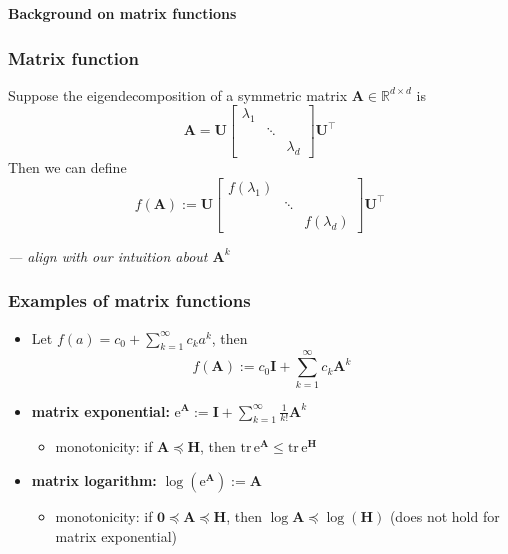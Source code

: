 \documentclass[compress,
mathserif,wide,%
]{beamer}
\begin{document}
\begin{frame}[plain]

\vfill
\begin{center}
  {\Large\bf Background on matrix functions}
\end{center}

\vfill

\end{frame}




\begin{frame}
\frametitle{Matrix function}  

Suppose the eigendecomposition of a symmetric matrix $\bm{A}\in \mathbb{R}^{d\times d}$ is 
%
{\small
\[
\bm{A}=\bm{U}\left[\begin{array}{ccc}
\lambda_{1}\\
 & \ddots\\
 &  & \lambda_{d}
\end{array}\right]\bm{U}^{\top}
\]
}
%
Then we can define 
%
{\small
\[
f(\bm{A}) := \bm{U}\left[\begin{array}{ccc}
f(\lambda_{1})\\
 & \ddots\\
 &  & f(\lambda_{d})
\end{array}\right]\bm{U}^{\top}
\]
}


{\hfill \em --- align with our intuition about $\bm{A}^{k}$}
\end{frame}


\begin{frame}
\frametitle{Examples of matrix functions}  

\begin{itemize}
	\itemsep1em
	\item Let $f(a)=c_0 + \sum_{k=1}^{\infty} c_k a^k$, then
	\[
		f(\bm{A}) := c_0 \bm{I} + \sum_{k=1}^{\infty} c_k {\bm A}^k
	\]
	\item {\bf matrix exponential:} $\mathrm{e}^{\bm{A}} := \bm{I} + \sum_{k=1}^{\infty} \frac{1}{k!} \bm{A}^k$

	\begin{itemize}
		\item monotonicity: if $\bm{A}\preceq \bm{H}$, then $\mathrm{tr}\,\mathrm{e}^{\bm{A}} \leq \mathrm{tr}\,\mathrm{e}^{\bm{H}}$
	\end{itemize}


	\item {\bf matrix logarithm:} $\log (\mathrm{e}^{\bm{A}} ) := \bm{A}$
		
	\begin{itemize}
		\item monotonicity: if $\bm{0}\preceq \bm{A}\preceq \bm{H}$, then $\log {\bm{A}} \preceq \log (\bm{H})$ (does not hold for matrix exponential) 
	\end{itemize}


\end{itemize}

\end{frame}
\end{document}
